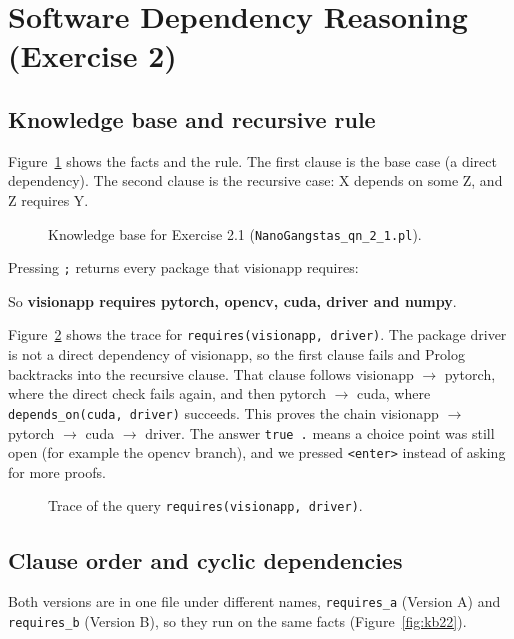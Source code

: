 \documentclass{article}
\newcommand{\team}{NanoGangstas}          %
\begin{document}
\section{Software Dependency Reasoning (Exercise 2)}

\subsection{Knowledge base and recursive rule}

Figure~\ref{fig:kb21} shows the facts and the rule. The first clause is the base case (a direct dependency).
The second clause is the recursive case: X depends on some Z, and Z requires Y.

\begin{figure}[!htb]
  \VerbatimInput{../\team_qn_2_1.pl}
  \caption{Knowledge base for Exercise 2.1 (\texttt{\team\_qn\_2\_1.pl}).}
  \label{fig:kb21}
\end{figure}

Pressing \texttt{;} returns every package that visionapp requires:


So \textbf{visionapp requires pytorch, opencv, cuda, driver and numpy}.

Figure~\ref{fig:trace21} shows the trace for \texttt{requires(visionapp, driver)}.
The package driver is not a direct dependency of visionapp, so the first clause fails and Prolog backtracks into the
recursive clause. That clause follows visionapp $\rightarrow$ pytorch, where the direct check fails again, and then pytorch $\rightarrow$ cuda, where
\texttt{depends\_on(cuda, driver)} succeeds. This proves the chain visionapp $\rightarrow$ pytorch $\rightarrow$ cuda $\rightarrow$ driver.
The answer \texttt{true .} means a choice point was still open (for example the opencv branch), and we pressed \texttt{<enter>} instead of asking for more proofs.

\begin{figure}[!htb]
  \caption{Trace of the query \texttt{requires(visionapp, driver)}.}
  \label{fig:trace21}
\end{figure}

\subsection{Clause order and cyclic dependencies}

Both versions are in one file under different names, \texttt{requires\_a} (Version A) and \texttt{requires\_b} (Version B),
so they run on the same facts (Figure~\ref{fig:kb22}).
\end{document}
